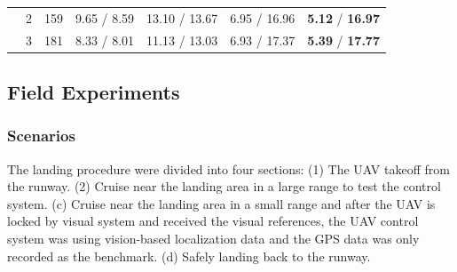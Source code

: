 \begin{table}[]
{\begin{tabular}{ccccccc}
			& 2                         & 159                     & 9.65 / 8.59  & 13.10 / 13.67 & 6.95 / 16.96 & \textbf{5.12} / \textbf{16.97}                                                         \\
			& 3                         & 181                     & 8.33 / 8.01  & 11.13 / 13.03 & 6.93 / 17.37 & \textbf{5.39} / \textbf{17.77}                                                         \\ \hline
		\end{tabular}%
	}
\end{table}

 
 

\subsection{Field Experiments}
\subsubsection{Scenarios}

The landing procedure were divided into four sections: (1) The UAV takeoff from the runway. (2) Cruise near the landing area in a large range to test the control system. (c) Cruise near the landing area in a small range and after the UAV is locked by visual system and received the visual references, the UAV control system was using vision-based localization data and the GPS data was only recorded as the benchmark. (d) Safely landing back to the runway.

 


